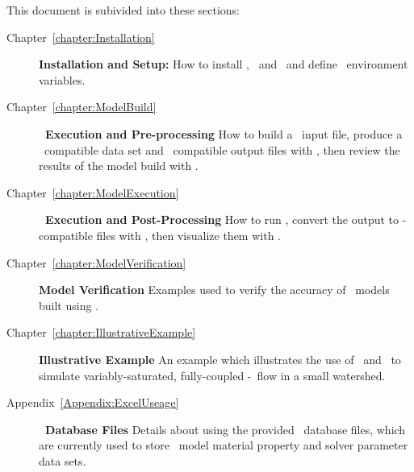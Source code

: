 This document is subivided into these sections:
\begin{description}
    \item[Chapter~\ref{chapter:Installation}]\textbf{Installation and Setup:} How to install \mut, \mfus\ and \tecplot\ and define \windows\ environment variables.
     \item[Chapter~\ref{chapter:ModelBuild}]\textbf{\mut\ Execution and Pre-processing} How to build a \mut\ input file, produce a \mfus\ compatible data set and \tecplot\ compatible output files with \mut, then review the results of the model build with \tecplot.
    \item[Chapter~\ref{chapter:ModelExecution}]\textbf{\mfus\ Execution and Post-Processing} How to run \mfus, convert the output to \tecplot-compatible files with \mut, then visualize them with \tecplot.
    \item[Chapter~\ref{chapter:ModelVerification}]\textbf{Model Verification} Examples used to verify the accuracy of \mfus\ models built using \mut.
    \item[Chapter~\ref{chapter:IllustrativeExample}]\textbf{Illustrative Example} An example which illustrates the use of \mut\ and \mfus\ to simulate variably-saturated, fully-coupled   \gwf-\swf\ flow in a small watershed.
    \item[Appendix~\ref{Appendix:ExcelUseage}]\textbf{\excel\ Database Files} Details about using the provided \excel\ database files, which are currently used to store \mfus\ model material property and solver parameter data sets.
        \end{description} 